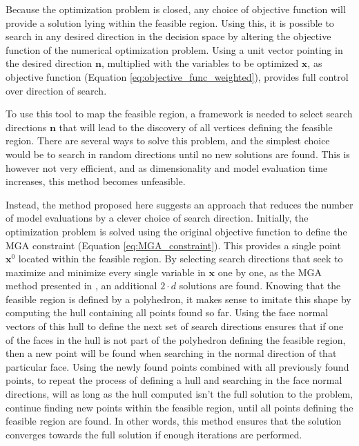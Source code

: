 Because the optimization problem is closed, any choice of objective function will provide a solution lying within the feasible region. Using this, it is possible to search in any desired direction in the decision space by altering the objective function of the numerical optimization problem. Using a unit vector pointing in the desired direction $\mathbf{n}$, multiplied with the variables to be optimized $\mathbf{x}$, as objective function (Equation \ref{eq:objective_func_weighted}), provides full control over direction of search. 


To use this tool to map the feasible region, a framework is needed to select search directions $\mathbf{n}$ that will lead to the discovery of all vertices defining the feasible region. There are several ways to solve this problem, and the simplest choice would be to search in random directions until no new solutions are found. This is however not very efficient, and as dimensionality and model evaluation time increases, this method becomes unfeasible. 

Instead, the method proposed here suggests an approach that reduces the number of model evaluations by a clever choice of search direction. Initially, the optimization problem is solved using the original objective function to define the MGA constraint (Equation \ref{eq:MGA_constraint}). This provides a single point $\mathbf{x}^0$ located within the feasible region. By selecting search directions that seek to maximize and minimize every single variable in $\mathbf{x}$ one by one, as the MGA method presented in \cite{Fabian_MGA}, an additional $2\cdot d$ solutions are found. Knowing that the feasible region is defined by a polyhedron, it makes sense to imitate this shape by computing the hull containing all points found so far. Using the face normal vectors of this hull to define the next set of search directions ensures that if one of the faces in the hull is not part of the polyhedron defining the feasible region, then a new point will be found when searching in the normal direction of that particular face. Using the newly found points combined with all previously found points, to repeat the process of defining a hull and searching in the face normal directions, will as long as the hull computed isn't the full solution to the problem, continue finding new points within the feasible region, until all points defining the feasible region are found. In other words, this method ensures that the solution converges towards the full solution if enough iterations are performed. 

